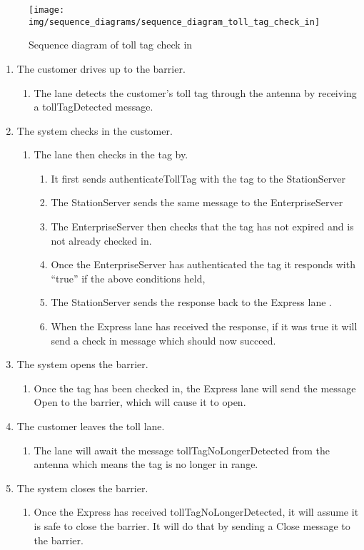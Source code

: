 \begin{figure}[H]
\centerline{\texttt{[image: img/sequence\_diagrams/sequence\_diagram\_toll\_tag\_check\_in]}}
\caption{Sequence diagram of toll tag check in}
\label{fig:seq_check_in_toll_tag}
\end{figure}

\begin{enumerate}
\item The customer drives up to the barrier.

\begin{enumerate}
\item The lane detects the customer's toll tag through the antenna by receiving
a tollTagDetected message.
\end{enumerate}
\item The system checks in the customer.

\begin{enumerate}
\item The lane then checks in the tag by. 

\begin{enumerate}
\item It first sends authenticateTollTag with the tag to the StationServer
\item The StationServer sends the same message to the EnterpriseServer
\item The EnterpriseServer then checks that the tag has not expired and
is not already checked in.
\item Once the EnterpriseServer has authenticated the tag it responds with
``true'' if the above conditions held,
\item The StationServer sends the response back to the Express lane .
\item When the Express lane has received the response, if it was true it
will send a check in message which should now succeed.
\end{enumerate}
\end{enumerate}
\item The system opens the barrier.

\begin{enumerate}
\item Once the tag has been checked in, the Express lane will send the message
Open to the barrier, which will cause it to open.
\end{enumerate}
\item The customer leaves the toll lane.

\begin{enumerate}
\item The lane will await the message tollTagNoLongerDetected from the antenna
which means the tag is no longer in range.
\end{enumerate}
\item The system closes the barrier.

\begin{enumerate}
\item Once the Express has received tollTagNoLongerDetected, it will assume
it is safe to close the barrier. It will do that by sending a Close
message to the barrier.\end{enumerate}
\end{enumerate}
